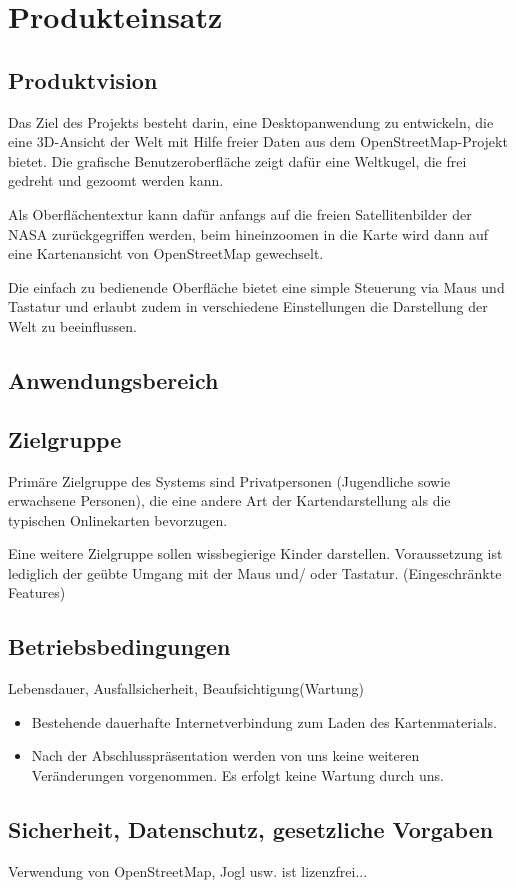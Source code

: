 
\chapter{Produkteinsatz}
\section{Produktvision}
Das Ziel des Projekts besteht darin, eine Desktopanwendung zu entwickeln, die eine 3D-Ansicht der Welt mit Hilfe freier Daten aus dem OpenStreetMap-Projekt bietet. Die grafische Benutzeroberfläche zeigt dafür eine Weltkugel, die frei gedreht und gezoomt werden kann. 

Als Oberflächentextur kann dafür anfangs auf die freien Satellitenbilder der
NASA zurückgegriffen werden, beim hineinzoomen in die Karte wird dann auf eine Kartenansicht von OpenStreetMap gewechselt.

Die einfach zu bedienende Oberfläche bietet eine simple Steuerung via Maus und Tastatur und erlaubt zudem in verschiedene Einstellungen die Darstellung der Welt zu beeinflussen. 


\section{Anwendungsbereich}



\section{Zielgruppe}
Primäre Zielgruppe des Systems sind Privatpersonen (Jugendliche sowie erwachsene Personen), die eine andere Art der Kartendarstellung als die typischen Onlinekarten bevorzugen.

Eine weitere Zielgruppe sollen wissbegierige Kinder darstellen. Voraussetzung ist lediglich der geübte Umgang mit der Maus und/ oder Tastatur. (Eingeschränkte Features)

\section{Betriebsbedingungen}
Lebensdauer, Ausfallsicherheit, Beaufsichtigung(Wartung)

\begin{itemize}
\item Bestehende dauerhafte Internetverbindung zum Laden des Kartenmaterials.
\item Nach  der  Abschlusspräsentation  werden  von  uns  keine  weiteren 
Veränderungen vorgenommen. Es erfolgt keine Wartung durch uns.
\end{itemize} 

\section{Sicherheit, Datenschutz, gesetzliche Vorgaben}
Verwendung von OpenStreetMap, Jogl usw. ist lizenzfrei...